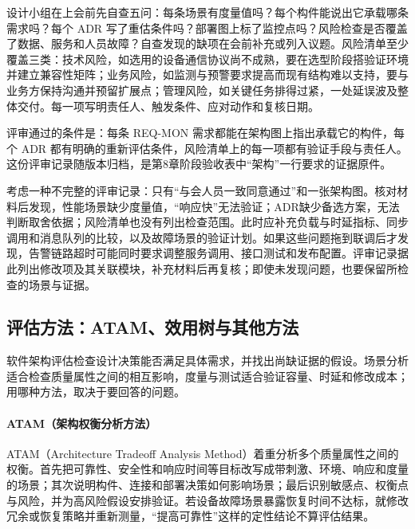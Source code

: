 设计小组在上会前先自查五问：每条场景有度量值吗？每个构件能说出它承载哪条需求吗？每个 ADR 写了重估条件吗？部署图上标了监控点吗？风险检查是否覆盖了数据、服务和人员故障？自查发现的缺项在会前补充或列入议题。风险清单至少覆盖三类：技术风险，如选用的设备通信协议尚不成熟，要在选型阶段搭验证环境并建立兼容性矩阵；业务风险，如监测与预警要求提高而现有结构难以支持，要与业务方保持沟通并预留扩展点；管理风险，如关键任务排得过紧，一处延误波及整体交付。每一项写明责任人、触发条件、应对动作和复核日期。

评审通过的条件是：每条 REQ-MON 需求都能在架构图上指出承载它的构件，每个 ADR 都有明确的重新评估条件，风险清单上的每一项都有验证手段与责任人。这份评审记录随版本归档，是第8章阶段验收表中“架构”一行要求的证据原件。

考虑一种不完整的评审记录：只有“与会人员一致同意通过”和一张架构图。核对材料后发现，性能场景缺少度量值，“响应快”无法验证；ADR缺少备选方案，无法判断取舍依据；风险清单也没有列出检查范围。此时应补充负载与时延指标、同步调用和消息队列的比较，以及故障场景的验证计划。如果这些问题拖到联调后才发现，告警链路超时可能同时要求调整服务调用、接口测试和发布配置。评审记录据此列出修改项及其关联模块，补充材料后再复核；即使未发现问题，也要保留所检查的场景与证据。

\subsection{评估方法：ATAM、效用树与其他方法}

软件架构评估检查设计决策能否满足具体需求，并找出尚缺证据的假设。场景分析适合检查质量属性之间的相互影响，度量与测试适合验证容量、时延和修改成本；用哪种方法，取决于要回答的问题。

\paragraph{ATAM（架构权衡分析方法）}

ATAM（Architecture Tradeoff Analysis Method）着重分析多个质量属性之间的权衡。首先把可靠性、安全性和响应时间等目标改写成带刺激、环境、响应和度量的场景；其次说明构件、连接和部署决策如何影响场景；最后识别敏感点、权衡点与风险，并为高风险假设安排验证。若设备故障场景暴露恢复时间不达标，就修改冗余或恢复策略并重新测量，“提高可靠性”这样的定性结论不算评估结果。

